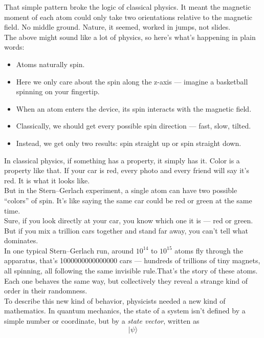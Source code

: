 \documentclass{article}
\begin{document}
That simple pattern broke the logic of classical physics. 
It meant the magnetic moment of each atom could only take two orientations 
relative to the magnetic field. No middle ground. 
Nature, it seemed, worked in jumps, not slides.\\

The above might sound like a lot of physics, so here’s what’s happening in plain words:  
\begin{itemize}
    \item Atoms naturally spin.
    \item Here we only care about the spin along the z-axis — imagine a basketball spinning on your fingertip.
    \item When an atom enters the device, its spin interacts with the magnetic field.
    \item Classically, we should get every possible spin direction — fast, slow, tilted.
    \item Instead, we get only two results: spin straight up or spin straight down.
\end{itemize}

In classical physics, if something has a property, it simply has it.  
Color is a property like that. If your car is red, every photo and every friend will say it’s red.  
It is what it looks like.\\

But in the Stern–Gerlach experiment, a single atom can have two possible “colors” of spin.  
It’s like saying the same car could be red or green at the same time.\\

Sure, if you look directly at your car, you know which one it is — red or green.  
But if you mix a trillion cars together and stand far away, you can’t tell what dominates.\\

In one typical Stern–Gerlach run, around $10^{14}$ to $10^{15}$ atoms fly through the apparatus, that's 1000000000000000 cars — hundreds of trillions of tiny magnets, all spinning, all following the same invisible rule.That’s the story of these atoms. Each one behaves the same way, 
but collectively they reveal a strange kind of order in their randomness.\\


To describe this new kind of behavior, physicists needed a new kind of mathematics.  
In quantum mechanics, the state of a system isn’t defined by a simple number or coordinate, 
but by a \textit{state vector}, written as
\[
|\psi\rangle
\]
\end{document}
